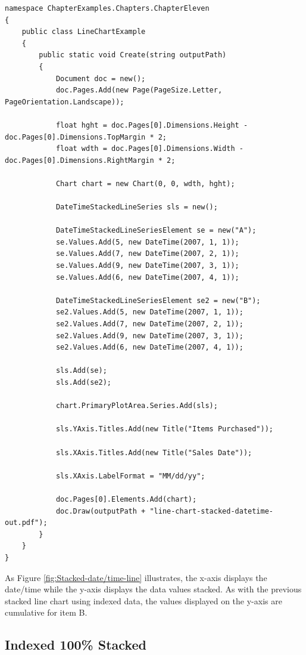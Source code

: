 \documentclass[american,letterpaper]{tufte-book}
\numberwithin{equation}{section}
\numberwithin{figure}{section}
\begin{document}
{\begin{lstlisting}[caption={Stacked date/time line chart.},label={lis:Stacked-date/time-line},basicstyle={\small\ttfamily},breaklines=true]
namespace ChapterExamples.Chapters.ChapterEleven
{
    public class LineChartExample
    {
        public static void Create(string outputPath)
        {
            Document doc = new();
            doc.Pages.Add(new Page(PageSize.Letter, PageOrientation.Landscape));

            float hght = doc.Pages[0].Dimensions.Height - doc.Pages[0].Dimensions.TopMargin * 2;
            float wdth = doc.Pages[0].Dimensions.Width - doc.Pages[0].Dimensions.RightMargin * 2;

            Chart chart = new Chart(0, 0, wdth, hght);
           
            DateTimeStackedLineSeries sls = new();

            DateTimeStackedLineSeriesElement se = new("A");
            se.Values.Add(5, new DateTime(2007, 1, 1));
            se.Values.Add(7, new DateTime(2007, 2, 1));
            se.Values.Add(9, new DateTime(2007, 3, 1));
            se.Values.Add(6, new DateTime(2007, 4, 1));

            DateTimeStackedLineSeriesElement se2 = new("B");
            se2.Values.Add(5, new DateTime(2007, 1, 1));
            se2.Values.Add(7, new DateTime(2007, 2, 1));
            se2.Values.Add(9, new DateTime(2007, 3, 1));
            se2.Values.Add(6, new DateTime(2007, 4, 1));
            
            sls.Add(se);
            sls.Add(se2);

            chart.PrimaryPlotArea.Series.Add(sls);

            sls.YAxis.Titles.Add(new Title("Items Purchased"));

            sls.XAxis.Titles.Add(new Title("Sales Date"));

            sls.XAxis.LabelFormat = "MM/dd/yy";

            doc.Pages[0].Elements.Add(chart);
            doc.Draw(outputPath + "line-chart-stacked-datetime-out.pdf");
        }
    }
}
\end{lstlisting}
\leavevmode\egroup
As Figure \ref{fig:Stacked-date/time-line} illustrates, the x-axis
displays the date/time while the y-axis displays the data values stacked.
As with the previous stacked line chart using indexed data, the values
displayed on the y-axis are cumulative for item B.

\subsection*{Indexed 100\% Stacked}

}
\end{document}
